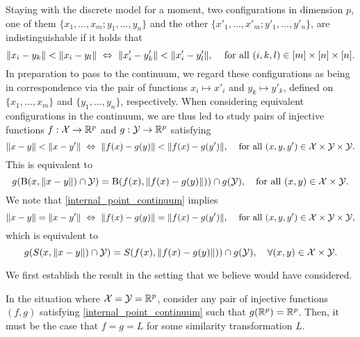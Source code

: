 \documentclass[twoside, 11pt]{article}
\begin{document}
Staying with the discrete model for a moment, two configurations in dimension $p$, one of them $\{x_1, \dots, x_m; y_1, \dots, y_n\}$ and the other $\{x'_1, \dots, x'_m; y'_1, \dots, y'_n\}$, are indistinguishable if it holds that
\begin{equation}
\label{internal_equivalent_point_discrete}
\text{$\|x_i-y_k\| < \|x_i-y_l\| \iff \|x'_i-y'_k\| < \|x'_i-y'_l\|$, \quad for all $(i,k,l) \in [m] \times [n] \times [n]$.}
\end{equation}
In preparation to pass to the continuum, we regard these configurations as being in correspondence via the pair of functions $x_i \mapsto x'_i$ and $y_k \mapsto y'_k$, defined on $\{x_1, \dots, x_m\}$ and $\{y_1, \dots, y_n\}$, respectively. 
When considering equivalent configurations in the continuum, we are thus led to study pairs of injective functions $f : \mathcal{X} \to \mathbb{R}^p$ and $g: \mathcal{Y} \to \mathbb{R}^p$ satisfying 
\begin{equation}
\label{internal_point_continuum}
\text{$\|x-y\| < \|x-y'\| \iff \|f(x)-g(y)\| < \|f(x)-g(y')\|$, \quad for all $(x, y, y') \in \cX \times \cY \times \cY$.}
\end{equation}
This is equivalent to 
\begin{equation}
\label{internal_point_continuum_set}
g(\ball(x, \|x-y\|) \cap \cY) = \ball(f(x), \|f(x)-g(y)\|)) \cap g(\cY), \quad \text{for all }(x,y) \in \cX \times \cY. 
\end{equation}
We note that \eqref{internal_point_continuum} implies
\begin{equation}
\label{internal_point_continuum_equal}
\text{$\|x-y\| = \|x-y'\| \iff \|f(x)-g(y)\| = \|f(x)-g(y')\|$, \quad for all $(x, y, y') \in \cX \times \cY \times \cY$,}
\end{equation}
which is equivalent to
\begin{equation}\label{internal_point_continuum_equal_set}
g(S(x, \|x-y\|) \cap \mathcal{Y}) = S(f(x), \|f(x)-g(y)\|)) \cap g(\mathcal{Y}), \quad \forall (x,y) \in \mathcal{X} \times \mathcal{Y}.
\end{equation}


We first establish the result in the setting that we believe \citet{shepard1966metric} would have considered.

\begin{proposition}
\label{prp:shepard_internal}
In the situation where $\mathcal{X} = \mathcal{Y} = \mathbb{R}^p$, consider any pair of injective functions $(f,g)$ satisfying \eqref{internal_point_continuum} such that $g(\mathbb{R}^p) = \mathbb{R}^p$. Then, it must be the case that $f = g = L$ for some similarity transformation $L$. 
\end{proposition}
\end{document}
